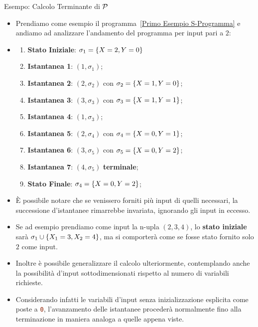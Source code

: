 \newpage
\begin{generalbox}[colframe=azure-gradient-3!90!black]{Esempo: Calcolo Terminante di \(\mathcal{P}\)}
\begin{itemize}
  \item [] Prendiamo come esempio il programma~\ref{Primo Esempio S-Programma} e andiamo ad analizzare l'andamento del programma per input pari a \textbf{\(2\)}:
  \item [] \begin{enumerate}[start=0]
    \item \textbf{Stato Iniziale}: \(\sigma_1 = \displaystyle{\left\{{X=2,Y=0}\right\}}\)
    \item \textbf{Istantanea 1}: \((1,\sigma_1)\);
    \item \textbf{Istantanea 2}: \((2,\sigma_2)\) con \(\sigma_2 = \displaystyle{\left\{{X=1,Y=0}\right\}}\);
    \item \textbf{Istantanea 3}: \((3,\sigma_3)\) con \(\sigma_3 = \displaystyle{\left\{{X=1,Y=1}\right\}}\);
    \item \textbf{Istantanea 4}: \((1,\sigma_3)\);
    \item \textbf{Istantanea 5}: \((2,\sigma_4)\) con \(\sigma_4 = \displaystyle{\left\{{X=0,Y=1}\right\}}\);
    \item \textbf{Istantanea 6}: \((3,\sigma_5)\) con \(\sigma_5 = \displaystyle{\left\{{X=0,Y=2}\right\}}\);
    \item \textbf{Istantanea 7}: \((4,\sigma_5)\) \textbf{terminale};
    \item \textbf{Stato Finale}: \(\sigma_4 = \displaystyle{\left\{{X=0,Y=2}\right\}}\);
  \end{enumerate}
  \item [] È possibile notare che se venissero forniti più input di quelli necessari, la successione d'istantanee rimarrebbe invariata, ignorando gli input in eccesso.
  \item [] Se ad esempio prendiamo come input la n-upla \((2,3,4)\), lo \textbf{stato iniziale} sarà \(\sigma_1 \cup \displaystyle{\left\{{X_1=3,X_2=4}\right\}}\), ma si comporterà come se fosse stato fornito solo \(2\) come input.
  \item [] Inoltre è possibile generalizzare il calcolo ulteriormente, contemplando anche la possibilità d'input sottodimensionati rispetto al numero di variabili richieste.
  \item [] Considerando infatti le variabili d'input senza inizializzazione esplicita come poste a \lstinline[language=ini]{0}, l'avanzamento delle istantanee procederà normalmente fino alla terminazione in maniera analoga a quelle appena viste.
\end{itemize}

\end{generalbox}

